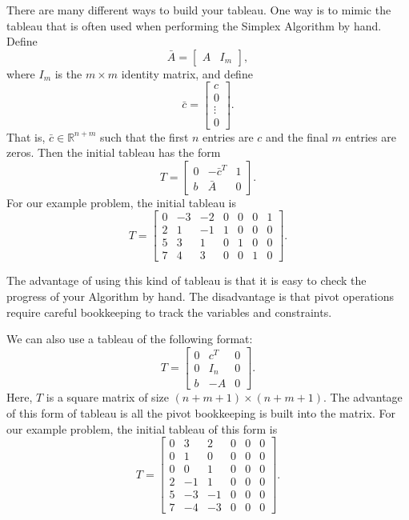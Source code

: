 There are many different ways to build your tableau.
One way is to mimic the tableau that is often used when performing the Simplex Algorithm by hand.
Define
\[
\bar{A} = \begin{bmatrix}
  A & I_m
\end{bmatrix},
\]
where $I_m$ is the $m \times m$ identity matrix,
and define
\[
\bar{c} = \begin{bmatrix}
  c\\
  0\\
  \vdots\\
  0
\end{bmatrix}.
\]
That is, $\bar{c} \in \mathbb{R}^{n+m}$ such that the first $n$ entries are $c$ and the final $m$ entries are zeros.
Then the initial tableau has the form
\begin{equation}
T = \begin{bmatrix}
    0 & -\bar{c}^T & 1  \\
    b & \bar{A} & 0
    \end{bmatrix}.
\label{eqn:hand_tab}
\end{equation}
For our example problem, the initial tableau is
\begin{equation*}
T = \begin{bmatrix}
    0 & -3 & -2 & 0 & 0 & 0 & 1\\
    2 & 1 & -1 & 1 & 0 & 0 & 0\\
    5 & 3 & 1 & 0 & 1 & 0 & 0\\
    7 & 4 & 3 & 0 & 0 & 1 & 0
    \end{bmatrix}.
\end{equation*}

The advantage of using this kind of tableau is that it is easy to check the progress of your Algorithm by hand.
The disadvantage is that pivot operations require careful bookkeeping to track the variables and constraints.

We can also use a tableau of the following format:
\begin{equation}
T = \begin{bmatrix}
    0 & c^T  & 0 \\
    0 & I_n & 0\\
    b & -A  & 0
\end{bmatrix}.
\label{eqn:matrix_tab}
\end{equation}
Here, $T$ is a square matrix of size $(n+m+1) \times (n+m+1)$.
The advantage of this form of tableau is all the pivot bookkeeping is built into the matrix.
For our example problem, the initial tableau of this form is
\begin{equation}
T = \begin{bmatrix}
        0 & 3 & 2 & 0 & 0 & 0 \\
        0 & 1 & 0 & 0 & 0 & 0 \\
        0 & 0 & 1 & 0 & 0 & 0 \\
        2 &-1 & 1 & 0 & 0 & 0 \\
        5 &-3 &-1 & 0 & 0 & 0 \\
        7 &-4 &-3 & 0 & 0 & 0
\end{bmatrix}.
\label{eqn:matrix_inittab}
\end{equation}

